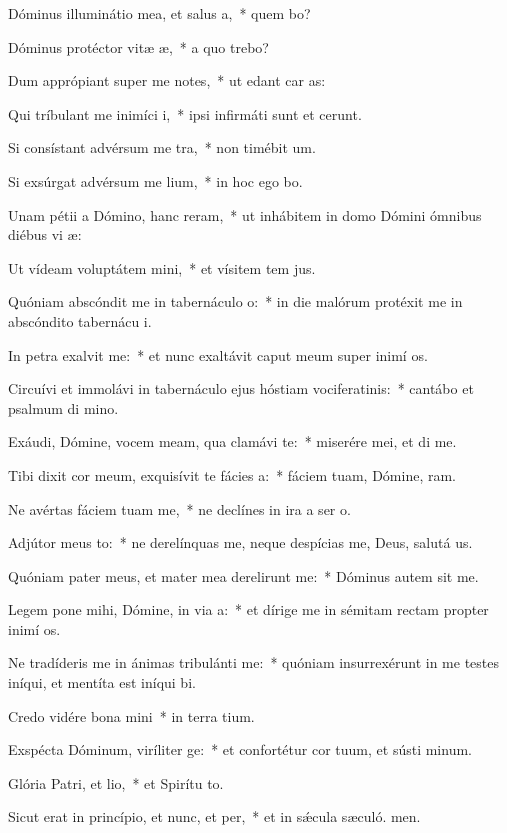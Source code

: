 \item Dóminus illuminátio mea, et salus a,~* quem bo?
\item Dóminus protéctor vitæ æ,~* a quo trebo?
\item Dum apprópiant super me notes,~* ut edant car as:
\item Qui tríbulant me inimíci i,~* ipsi infirmáti sunt et cerunt.
\item Si consístant advérsum me tra,~* non timébit  um.
\item Si exsúrgat advérsum me lium,~* in hoc ego bo.
\item Unam pétii a Dómino, hanc reram,~* ut inhábitem in domo Dómini ómnibus diébus vi æ:
\item Ut vídeam voluptátem mini,~* et vísitem tem jus.
\item Quóniam abscóndit me in tabernáculo o:~* in die malórum protéxit me in abscóndito tabernácu i.
\item In petra exalvit me:~* et nunc exaltávit caput meum super inimí os.
\item Circuívi et immolávi in tabernáculo ejus hóstiam vociferatinis:~* cantábo et psalmum di mino.
\item Exáudi, Dómine, vocem meam, qua clamávi  te:~* miserére mei, et di me.
\item Tibi dixit cor meum, exquisívit te fácies a:~* fáciem tuam, Dómine, ram.
\item Ne avértas fáciem tuam  me,~* ne declínes in ira a ser o.
\item Adjútor meus to:~* ne derelínquas me, neque despícias me, Deus, salutá us.
\item Quóniam pater meus, et mater mea derelirunt me:~* Dóminus autem sit me.
\item Legem pone mihi, Dómine, in via a:~* et dírige me in sémitam rectam propter inimí os.
\item Ne tradíderis me in ánimas tribulánti me:~* quóniam insurrexérunt in me testes iníqui, et mentíta est iníqui bi.
\item Credo vidére bona mini~* in terra tium.
\item Exspécta Dóminum, viríliter ge:~* et confortétur cor tuum, et sústi minum.
\item Glória Patri, et lio,~* et Spirítu to.
\item Sicut erat in princípio, et nunc, et per,~* et in sǽcula sæculó. men.
